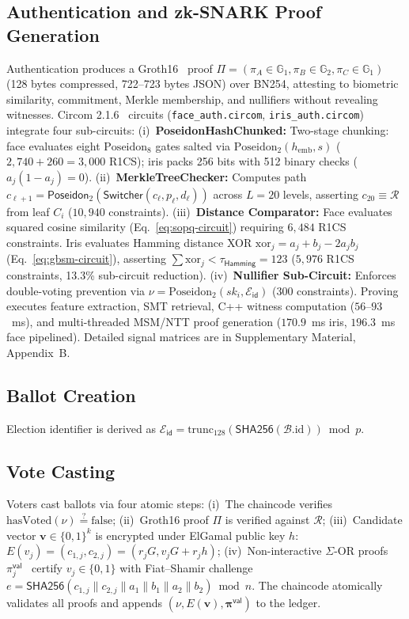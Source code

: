 \documentclass[10pt,letterpaper,journal]{IEEEtran}
\begin{document}
\subsection{Authentication and zk-SNARK Proof Generation}
Authentication produces a Groth16~\cite{Groth2016} proof $\Pi = (\pi_A \in \mathbb{G}_1, \pi_B \in \mathbb{G}_2, \pi_C \in \mathbb{G}_1)$ (128 bytes compressed, 722--723 bytes JSON) over BN254, attesting to biometric similarity, commitment, Merkle membership, and nullifiers without revealing witnesses. Circom 2.1.6~\cite{Circom2023} circuits (\texttt{face\_auth.circom}, \texttt{iris\_auth.circom}) integrate four sub-circuits:
(i)~\textbf{PoseidonHashChunked:} Two-stage chunking: face evaluates eight $\text{Poseidon}_8$ gates salted via $\text{Poseidon}_2(h_{\text{emb}}, s)$ ($2{,}740 + 260 = 3{,}000$ R1CS); iris packs 256 bits with 512 binary checks ($a_j(1-a_j)=0$).
(ii)~\textbf{MerkleTreeChecker:} Computes path $c_{\ell+1} = \mathsf{Poseidon}_2(\mathsf{Switcher}(c_\ell, p_\ell, d_\ell))$ across $L=20$ levels, asserting $c_{20} \equiv \mathcal{R}$ from leaf $C_i$ ($10{,}940$ constraints).
(iii)~\textbf{Distance Comparator:} Face evaluates squared cosine similarity (Eq.~\eqref{eq:sopq-circuit}) requiring $6{,}484$ R1CS constraints. Iris evaluates Hamming distance XOR $\text{xor}_j = a_j + b_j - 2a_j b_j$ (Eq.~\eqref{eq:gbsm-circuit}), asserting $\sum \text{xor}_j < \tau_{\mathsf{Hamming}} = 123$ ($5{,}976$ R1CS constraints, 13.3\% sub-circuit reduction).
(iv)~\textbf{Nullifier Sub-Circuit:} Enforces double-voting prevention via $\nu = \text{Poseidon}_2(sk_i, \mathcal{E}_{\mathsf{id}})$ ($300$ constraints).
Proving executes feature extraction, SMT retrieval, C++ witness computation ($56$--$93$~ms), and multi-threaded MSM/NTT proof generation ($170.9$~ms iris, $196.3$~ms face pipelined). Detailed signal matrices are in Supplementary Material, Appendix~B.

\subsection{Ballot Creation}
Election identifier is derived as $\mathcal{E}_{\mathsf{id}} = \text{trunc}_{128}(\mathsf{SHA256}(\mathcal{B}.\text{id})) \bmod p$.

\subsection{Vote Casting}
Voters cast ballots via four atomic steps: (i)~The chaincode verifies $\text{hasVoted}(\nu) \stackrel{?}{=} \text{false}$; (ii)~Groth16 proof $\Pi$ is verified against $\mathcal{R}$; (iii)~Candidate vector $\mathbf{v} \in \{0,1\}^k$ is encrypted under ElGamal public key $h$: $E(v_j) = (c_{1,j}, c_{2,j}) = (r_j G, v_j G + r_j h)$; (iv)~Non-interactive $\Sigma$-OR proofs $\pi_j^{\mathsf{val}}$~\cite{ChaumPedersen1992} certify $v_j \in \{0,1\}$ with Fiat--Shamir challenge $e = \mathsf{SHA256}(c_{1,j} \parallel c_{2,j} \parallel a_1 \parallel b_1 \parallel a_2 \parallel b_2) \bmod n$. The chaincode atomically validates all proofs and appends $(\nu, E(\mathbf{v}), \boldsymbol{\pi}^{\mathsf{val}})$ to the ledger.
\end{document}
